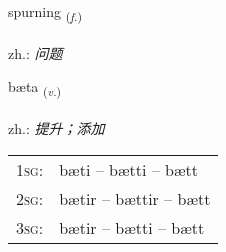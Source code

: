 \documentclass[frontgrid, backgrid]{flacards}\usepackage[]{graphicx}\usepackage[]{xcolor}
\begin{document}
\renewcommand{\flhead}{\vskip5pt \fboxsep=0pt {\small\bfseries\footnotesize Nafnorð | 名词}}
\renewcommand{\fcfoot}{\vskip5pt \fboxsep=0pt \hspace{2pt}{\small\bfseries\footnotesize 1K}}

\renewcommand{\blhead}{\vskip5pt {\small\bfseries\footnotesize Nafnorð | 名词 }}
\renewcommand{\bcfoot}{\vskip5pt \hspace{2pt}{\small\bfseries\footnotesize 1K}}


{spurning \small{\textsubscript{(\textit{f.})}} \\[1ex] %
\textphonetic{[spʏrtniŋk]} \\
zh.: \emph{问题} \\  [2ex]
\renewcommand*{\arraystretch}{0.8}
}

\renewcommand{\flhead}{\vskip5pt \fboxsep=0pt {\small\bfseries\footnotesize Sagnorð | 动词}}
\renewcommand{\fcfoot}{\vskip5pt \fboxsep=0pt \hspace{2pt}{\small\bfseries\footnotesize 1K}}

\renewcommand{\blhead}{\vskip5pt {\small\bfseries\footnotesize Sagnorð | 动词 }}
\renewcommand{\bcfoot}{\vskip5pt \hspace{2pt}{\small\bfseries\footnotesize 1K}}


{bæta \small{\textsubscript{(\textit{v.})}} \\[1ex] %
\textphonetic{[paiːta]} \\
zh.: \emph{提升；添加} \\  [2ex]
\renewcommand*{\arraystretch}{0.8}
\begin{tabular}{p{1cm}l}
\textsc{1sg}: & bæti -- bætti -- bætt \\ 
\textsc{2sg}: & bætir -- bættir -- bætt \\ 
\textsc{3sg}: & bætir -- bætti -- bætt \\ 
\end{tabular}
}
\end{document}
